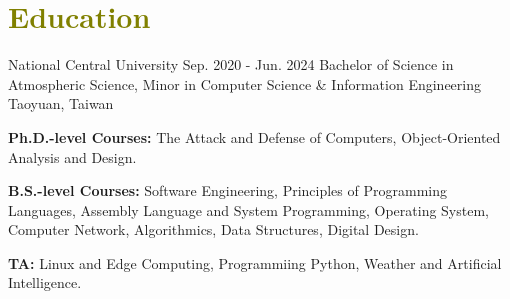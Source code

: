

\section{\textcolor{olive}{\textbf{Education}}}
	\resumeSubHeadingListStart
		
    \resumeSubheading
        { National Central University}
        {Sep. 2020 - Jun. 2024}
        {Bachelor of Science in Atmospheric Science, Minor in Computer Science \& Information Engineering \myScore}
        {\textcolor{gray}{\footnotesize{\faMapMarker}} Taoyuan, Taiwan}
		
    \vspace{-1.0mm}
		
    \resumeItemListStart
        \item {
            \textbf{Ph.D.-level Courses:}
            The Attack and Defense of Computers,
            Object-Oriented Analysis and Design.
        }
        \item {
            \textbf{B.S.-level Courses:}
            Software Engineering,
            Principles of Programming Languages,
            Assembly Language and System Programming,
            Operating System,
            Computer Network,
            Algorithmics, 
            Data Structures, 
            Digital Design.
        }
        \item {
            \textbf{TA:} 
            Linux and Edge Computing,
            Programmiing Python, 
            Weather and Artificial Intelligence.
        }
    \resumeItemListEnd
		  
	\resumeSubHeadingListEnd
